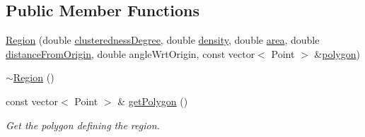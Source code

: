 \subsection*{\-Public \-Member \-Functions}
\begin{DoxyCompactItemize}
\item 
\hyperlink{classmultiscale_1_1analysis_1_1Region_a4f4d296d1a4cbeb10690da7af5ba91d2}{\-Region} (double \hyperlink{classmultiscale_1_1analysis_1_1SpatialEntityPseudo3D_a22a84312e7c497cc5fbc4d8b41d8fd45}{clusteredness\-Degree}, double \hyperlink{classmultiscale_1_1analysis_1_1SpatialEntityPseudo3D_aedf807816f8c2f7cd961acfe0042fc56}{density}, double \hyperlink{classmultiscale_1_1analysis_1_1SpatialEntityPseudo3D_a1621d5b3ece663bf4c5501940e860292}{area}, double \hyperlink{classmultiscale_1_1analysis_1_1SpatialEntityPseudo3D_a056f67b90ed41c0e6dc4df31b71ad906}{distance\-From\-Origin}, double angle\-Wrt\-Origin, const vector$<$ \-Point $>$ \&\hyperlink{classmultiscale_1_1analysis_1_1Region_a40d1b47f30bb09c6a47521a968163b6d}{polygon})
\item 
\hyperlink{classmultiscale_1_1analysis_1_1Region_a3c3670fff78f7511d156e3b2f0bc6266}{$\sim$\-Region} ()
\item 
const vector$<$ \-Point $>$ \& \hyperlink{classmultiscale_1_1analysis_1_1Region_a60e366526dfda2852871c29b70010fb7}{get\-Polygon} ()
\begin{DoxyCompactList}\small\item\em \-Get the polygon defining the region. \end{DoxyCompactList}\end{DoxyCompactItemize}
